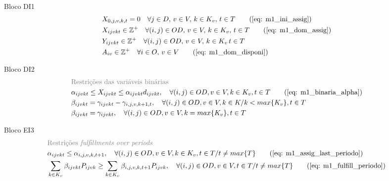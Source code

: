 \begin{bloque1}{Bloco \hypertarget{frase:DI1}{DI1} }
\begin{align}
	 & X_{0,j,v,k,t} = 0 \quad \forall j \in D,\, v \in V,\, k \in K_v,\, t \in T  \tag{\ref{eq: m1_ini_assig}}                                                                                                                   \\
	 & X_{ijvkt} \in \mathbb{Z}^+ \quad \forall(i,j) \in OD,\, v \in V,\, k \in K_v,\, t \in T  \tag{\ref{eq: m1_dom_assig}}                                                                                                      \\
	 & Y_{ijvkt} \in \mathbb{Z}^+ \quad \forall(i,j) \in OD,\, v \in V,\, k \in K_v\, t \in T \label{eq: dominio_y}                                                                                                               \\
	 & A_{iv} \in \mathbb{Z}^+ \quad \forall i \in O,\, v \in V  \tag{\ref{eq: m1_dom_disponi}}
\end{align}
\end{bloque1}

\begin{bloque2}{Bloco \hypertarget{frase:DI2}{DI2}}
\allowdisplaybreaks
\begin{align}
	 & \textcolor{gray}{\text{Restrições das variáveis binárias}} \notag   \\ 
	 & \alpha_{ijvkt} \leq X_{ijvkt} \leq \alpha_{ijvkt}d_{ijvkt}, \quad   \forall(i,j) \in OD, v \in V, k \in K_v, t \in T   \tag{\ref{eq: m1_binaria_alpha}}                                                                    \\
	 & \beta_{ijvkt} = \gamma_{ijvkt} - \gamma_{i,j,v,k+1,t}, \quad \forall (i,j) \in OD, v \in V, k \in K /k < max\{K_v\}, t\in T  \label{eq: bin_Beta}                                                                          \\
	 & \beta_{ijvkt} = \gamma_{ijvkt}, \quad   \forall(i,j) \in OD, v \in V, k = max\{K_v\}, t \in T                            \label{eq: bin_Beta_2}                                                                            
\end{align}
\end{bloque2}


\begin{bloque3}{Bloco \hypertarget{frase:EI3.2}{EI3}}
\allowdisplaybreaks
\begin{align}
	 & \textcolor{gray}{\text{Restrições \textit{fulfillments over periods}}} \notag   \\
	 & \alpha_{ijvkt} \leq \alpha_{i,j,v,k,t+1}, \quad   \forall(i,j) \in OD, v \in V, k \in K_v, t \in T/ t \neq max\{T\}     \tag{\ref{eq: m1_assig_last_periodo}}                                                              \\
	 & \sum_{k \in K_v}\beta_{ijvkt}P_{ijvk} \geq \sum_{k \in K_v}\beta_{i,j,v,k,t+1}P_{ijvk},  \quad   \forall(i,j) \in OD, v \in V, t \in T/ t \neq max\{T\}   \tag{\ref{eq: m1_fulfill_periodo}}
\end{align}
\end{bloque3}


